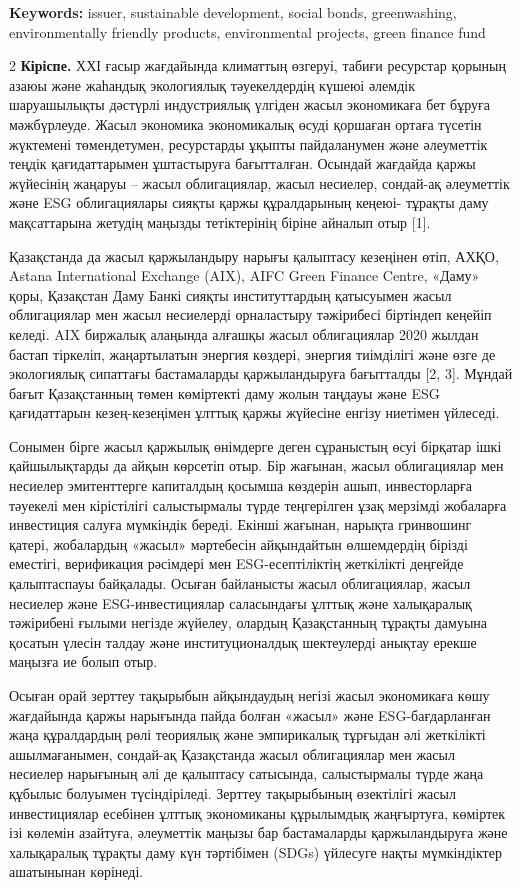 {\bfseries Keywords:} issuer, sustainable development, social bonds,
greenwashing, environmentally friendly products, environmental projects,
green finance fund

\begin{multicols}{2}
{\bfseries Кіріспе.} ХХІ ғасыр жағдайында климаттың өзгеруі, табиғи
ресурстар қорының азаюы және жаһандық экологиялық тәуекелдердің күшеюі
әлемдік шаруашылықты дәстүрлі индустриялық үлгіден жасыл экономикаға бет
бұруға мәжбүрлеуде. Жасыл экономика экономикалық өсуді қоршаған ортаға
түсетін жүктемені төмендетумен, ресурстарды ұқыпты пайдаланумен және
әлеуметтік теңдік қағидаттарымен ұштастыруға бағытталған. Осындай
жағдайда қаржы жүйесінің жаңаруы -- жасыл облигациялар, жасыл несиелер,
сондай-ақ әлеуметтік және ESG облигациялары сияқты қаржы құралдарының
кеңеюі- тұрақты даму мақсаттарына жетудің маңызды тетіктерінің біріне
айналып отыр {[}1{]}.

Қазақстанда да жасыл қаржыландыру нарығы қалыптасу кезеңінен өтіп, АХҚО,
Astana International Exchange (AIX), AIFC Green Finance Centre, «Даму»
қоры, Қазақстан Даму Банкі сияқты институттардың қатысуымен жасыл
облигациялар мен жасыл несиелерді орналастыру тәжірибесі біртіндеп
кеңейіп келеді. AIX биржалық алаңында алғашқы жасыл облигациялар 2020
жылдан бастап тіркеліп, жаңартылатын энергия көздері, энергия тиімділігі
және өзге де экологиялық сипаттағы бастамаларды қаржыландыруға
бағытталды {[}2, 3{]}. Мұндай бағыт Қазақстанның төмен көміртекті даму
жолын таңдауы және ESG қағидаттарын кезең-кезеңімен ұлттық қаржы
жүйесіне енгізу ниетімен үйлеседі.

Сонымен бірге жасыл қаржылық өнімдерге деген сұраныстың өсуі бірқатар
ішкі қайшылықтарды да айқын көрсетіп отыр. Бір жағынан, жасыл
облигациялар мен несиелер эмитенттерге капиталдың қосымша көздерін ашып,
инвесторларға тәуекелі мен кірістілігі салыстырмалы түрде теңгерілген
ұзақ мерзімді жобаларға инвестиция салуға мүмкіндік береді. Екінші
жағынан, нарықта гринвошинг қатері, жобалардың «жасыл» мәртебесін
айқындайтын өлшемдердің бірізді еместігі, верификация рәсімдері мен
ESG-есептіліктің жеткілікті деңгейде қалыптаспауы байқалады. Осыған
байланысты жасыл облигациялар, жасыл несиелер және ESG-инвестициялар
саласындағы ұлттық және халықаралық тәжірибені ғылыми негізде жүйелеу,
олардың Қазақстанның тұрақты дамуына қосатын үлесін талдау және
институционалдық шектеулерді анықтау ерекше маңызға ие болып отыр.

Осыған орай зерттеу тақырыбын айқындаудың негізі жасыл экономикаға көшу
жағдайында қаржы нарығында пайда болған «жасыл» және ESG-бағдарланған
жаңа құралдардың рөлі теориялық және эмпирикалық тұрғыдан әлі жеткілікті
ашылмағанымен, сондай-ақ Қазақстанда жасыл облигациялар мен жасыл
несиелер нарығының әлі де қалыптасу сатысында, салыстырмалы түрде жаңа
құбылыс болуымен түсіндіріледі. Зерттеу тақырыбының өзектілігі жасыл
инвестициялар есебінен ұлттық экономиканы құрылымдық жаңғыртуға,
көміртек ізі көлемін азайтуға, әлеуметтік маңызы бар бастамаларды
қаржыландыруға және халықаралық тұрақты даму күн тәртібімен (SDGs)
үйлесуге нақты мүмкіндіктер ашатынынан көрінеді.


\end{multicols}
